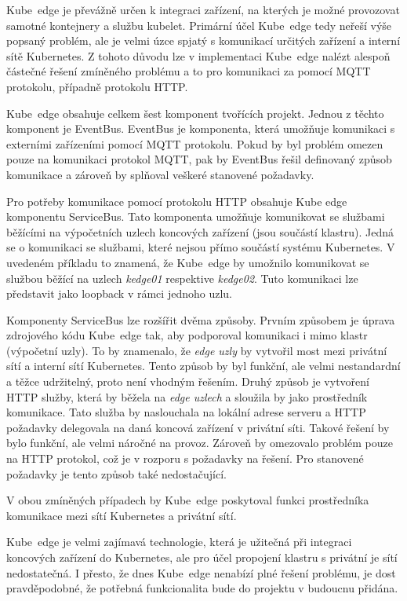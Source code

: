 Kube~edge je převážně určen k integraci zařízení, na kterých je možné provozovat samotné kontejnery a službu kubelet. Primární účel Kube~edge tedy neřeší výše popsaný problém, ale je velmi úzce spjatý s komunikací určitých zařízení a interní sítě Kubernetes. Z tohoto důvodu lze v implementaci Kube~edge nalézt alespoň částečné řešení zmíněného problému a to pro komunikaci za pomocí MQTT protokolu, případně protokolu HTTP.

\bigskip

Kube~edge obsahuje celkem šest komponent tvořících projekt. Jednou z těchto komponent je EventBus. EventBus je komponenta, která umožňuje komunikaci s externími zařízeními pomocí MQTT protokolu. Pokud by byl problém omezen pouze na komunikaci protokol MQTT, pak by EventBus řešil definovaný způsob komunikace a zároveň by splňoval veškeré stanovené požadavky.

Pro potřeby komunikace pomocí protokolu HTTP obsahuje Kube edge komponentu ServiceBus. Tato komponenta umožňuje komunikovat se službami běžícími na výpočetních uzlech koncových zařízení (jsou součástí klastru). Jedná se o komunikaci se službami, které nejsou přímo součástí systému Kubernetes. V uvedeném příkladu to znamená, že Kube~edge by umožnilo komunikovat se službou běžící na uzlech \textit{kedge01} respektive \textit{kedge02}. Tuto komunikaci lze představit jako loopback v rámci jednoho uzlu.

Komponenty ServiceBus lze rozšířit dvěma způsoby. Prvním způsobem je úprava zdrojového kódu Kube~edge tak, aby podporoval komunikaci i mimo klastr (výpočetní uzly). To by znamenalo, že \textit{edge uzly} by vytvořil most mezi privátní sítí a interní sítí Kubernetes. Tento způsob by byl funkční, ale velmi nestandardní a těžce udržitelný, proto není vhodným řešením. Druhý způsob je vytvoření HTTP služby, která by běžela na \textit{edge uzlech} a sloužila by jako prostředník komunikace. Tato služba by naslouchala na lokální adrese serveru a HTTP požadavky delegovala na daná koncová zařízení v privátní síti. Takové řešení by bylo funkční, ale velmi náročné na provoz. Zároveň by omezovalo problém pouze na HTTP protokol, což je v rozporu s požadavky na řešení. Pro stanovené požadavky je tento způsob také nedostačující. \cite{ttlv_2021_servicebusgo}

\bigskip

V obou zmíněných případech by Kube~edge poskytoval funkci prostředníka komunikace mezi sítí Kubernetes a privátní sítí.

Kube~edge je velmi zajímavá technologie, která je užitečná při integraci koncových zařízení do Kubernetes, ale pro účel propojení klastru s privátní je sítí nedostatečná. I přesto, že dnes Kube~edge nenabízí plné řešení problému, je dost pravděpodobné, že potřebná funkcionalita bude do projektu v budoucnu přidána. 

